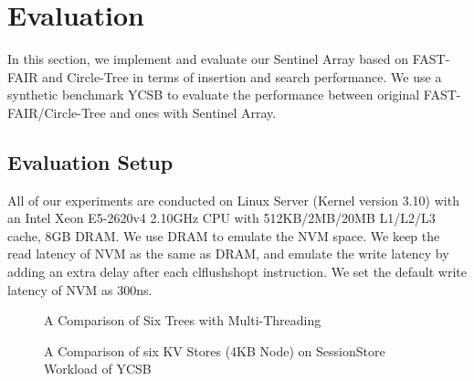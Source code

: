 \section{Evaluation}



In this section, we implement and evaluate our Sentinel Array based on FAST-FAIR and Circle-Tree in terms of insertion and search performance. We use a synthetic benchmark YCSB \cite{cooper2010benchmarking} to evaluate the performance between original FAST-FAIR/Circle-Tree and ones with Sentinel Array. 

\subsection{Evaluation Setup}\label{AA}
All of our experiments are conducted on Linux Server (Kernel version 3.10) with an Intel \textsuperscript{\textregistered} Xeon \textsuperscript{\textregistered} E5-2620v4 2.10GHz CPU with 512KB/2MB/20MB L1/L2/L3 cache, 8GB DRAM. We use DRAM to emulate the NVM space. We keep the read latency of NVM as the same as DRAM, and emulate the write latency by adding an extra delay after each \textsf{clflushshopt} instruction. We set the default write latency of NVM as 300ns. \cite{yang2015nv, zhao2013kiln, wang2019circ}



\begin{figure}[t]
\centering
{}%
%
\centering
\caption{A Comparison of Six Trees with Multi-Threading}
\label{concurrent_testing} 
\end{figure}



\begin{figure*}[t]
\centering
{}%
%
%
\centering
\caption{A Comparison of six KV Stores (4KB Node) on SessionStore Workload of YCSB}
\end{figure*}

